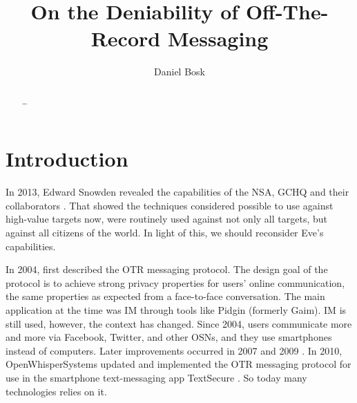 \title{%
  On the Deniability of Off-The-Record Messaging
}
\author{%
  Daniel Bosk
}

\maketitle
\begin{abstract}
  \dots
\end{abstract}


\acresetall
\section{Introduction}

In 2013, Edward Snowden \cite{landau2013making} revealed the capabilities of 
the \ac{NSA}, \ac{GCHQ} and their collaborators \cite[e.g.][]{nsa1,nsa2}.
That showed the techniques considered possible to use against high-value 
targets now, were routinely used against not only all targets, but against all 
citizens of the world.
In light of this, we should reconsider Eve's capabilities.

In 2004, \citeauthor{otr2004} \cite{otr2004} first described the \ac{OTR} 
messaging protocol.
The design goal of the protocol is to achieve strong privacy properties for 
users' online communication, the same properties as expected from 
a face-to-face conversation.
The main application at the time was \ac{IM} through tools like Pidgin 
\cite{pidgin} (formerly Gaim).
\ac{IM} is still used, however, the context has changed.
Since 2004, users communicate more and more via Facebook, Twitter, and other 
\acp{OSN}, and they use smartphones instead of computers.
Later improvements occurred in 2007 \cite{otr2007} and 2009 \cite{multiotr2009}.
In 2010, OpenWhisperSystems updated and implemented the \ac{OTR} messaging 
protocol for use in the smartphone text-messaging app TextSecure 
\cite{textsecure}.
So today many technologies relies on it.

